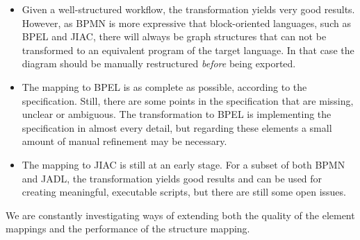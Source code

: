 \begin{itemize}
	\item Given a well-structured workflow, the transformation yields very good
	results.  However, as BPMN is more expressive that block-oriented languages,
	such as BPEL and JIAC, there will always be graph structures that can not be
	transformed to an equivalent program of the target language.  In that case
	the diagram should be manually restructured \emph{before} being exported.
	
	\item The mapping to BPEL is as complete as possible, according to the
	specification.  Still, there are some points in the specification that are
	missing, unclear or ambiguous.  The transformation to BPEL is implementing
	the specification in almost every detail, but regarding these elements a small
	amount of manual refinement may be necessary.
	
	\item The mapping to JIAC is still at an early stage.  For a subset of both
	BPMN and JADL, the transformation yields good results and can be used for
	creating meaningful, executable scripts, but there are still some open issues.
\end{itemize}

We are constantly investigating ways of extending both the quality of the element
mappings and the performance of the structure mapping.

